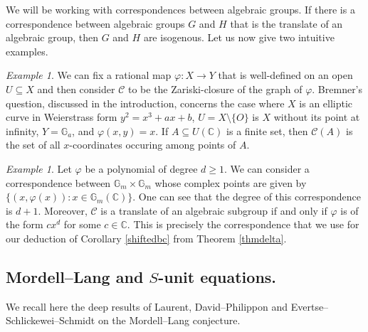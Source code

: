 \documentclass[12pt, reqno]{amsart}
\newcommand{\G}{\mathbb{G}}
\newcommand{\C}{\mathbb{C}}
\theoremstyle{remark}
\newtheorem{example}[theorem]{Example}
\theoremstyle{definition}
\numberwithin{equation}{section}
\begin{document}
We will be working with correspondences between algebraic groups. 
If there is a correspondence between algebraic groups $G$ and $H$ that is the translate of an algebraic group, then $G$ and $H$ are isogenous. Let us now give two intuitive examples. 

\begin{example}
    We can fix a rational map $\varphi: X \rightarrow Y$ that is well-defined on an open $U \subseteq X$ and then consider $\mathcal{C}$ to be the Zariski-closure of the graph of $\varphi$. Bremner's question, discussed in the introduction, concerns the case where $X$ is an elliptic curve in Weierstrass form $y^2 = x^3 + ax + b$, $U = X \setminus \{O\}$ is $X$ without its point at infinity, $Y = \G_a$, and $\varphi(x, y) = x$. If $A \subseteq U(\C)$ is a finite set, then $\mathcal{C}(A)$ is the set of all $x$-coordinates occuring among points of $A$.
\end{example} 

\begin{example}
    Let $\varphi$ be a polynomial of degree $d \geq 1$. We can consider a correspondence between $\G_m \times \G_m$ whose complex points are given by $\{(x, \varphi(x)) : x \in \G_m(\mathbb{C}) \}$. One can see that the degree of this correspondence is $d + 1$. Moreover, $\mathcal{C}$ is a translate of an algebraic subgroup if and only if $\varphi$ is of the form $c x^d$ for some $c \in \C$. This is precisely the correspondence that we use for our deduction of Corollary \ref{shiftedbc} from Theorem \ref{thmdelta}.
\end{example}






\subsection{Mordell--Lang and $S$-unit equations. } \label{mordelllangsunit}



We recall here the deep results of Laurent, David--Philippon and Evertse--Schlickewei--Schmidt on the Mordell--Lang conjecture.  
\end{document}
